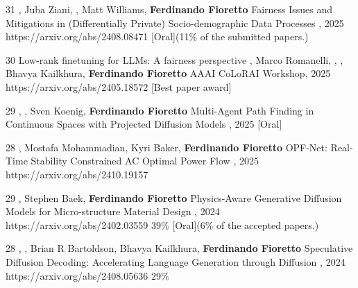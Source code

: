 \begin{pubs}

\wsentryAwd
	{31} 
	{, Juba Ziani, , Matt Williams, {\bf Ferdinando Fioretto}}
	{Fairness Issues and Mitigations in (Differentially Private) Socio-demographic Data Processes}
	{, 2025}
	{https://arxiv.org/abs/2408.08471}
	{[Oral]}{(11\% of the submitted papers.)}

\wsentryAwd
	{30}
	{Low-rank finetuning for LLMs: A fairness perspective}
	{, Marco Romanelli, , , Bhavya Kailkhura,  {\bf Ferdinando Fioretto}}
	{{\venue AAAI CoLoRAI Workshop}, 2025}
	{https://arxiv.org/abs/2405.18572}
	{[Best paper award]}{}

\wsentryAwd
	{29} 
	{, , Sven Koenig, {\bf Ferdinando Fioretto}}
	{Multi-Agent Path Finding in Continuous Spaces with Projected Diffusion Models}
	{, 2025}
	{}
	{[Oral]}{}
	
\wsentry
	{28}
	{, Mostafa Mohammadian, Kyri Baker, {\bf Ferdinando Fioretto}}
	{OPF-Net: Real-Time Stability Constrained AC Optimal Power Flow}
	{, 2025}
	{https://arxiv.org/abs/2410.19157}

\wsentryAwdAR
	{29}
	{, Stephen Baek, {\bf Ferdinando Fioretto}}
  	{Physics-Aware Generative Diffusion Models for Micro-structure Material Design}
  	{, 2024}
	{https://arxiv.org/abs/2402.03559}
	{39\%}
	{[Oral]}{(6\% of the accepted papers.)}

\wsentryAR
	{28}
	{, , Brian R Bartoldson, Bhavya Kailkhura, {\bf Ferdinando Fioretto}}
	{Speculative Diffusion Decoding: Accelerating Language Generation through Diffusion}
	{, 2024}
	{https://arxiv.org/abs/2408.05636}
	{29\%}


\end{pubs}
